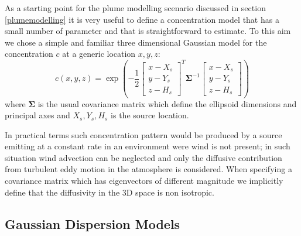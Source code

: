 \documentclass[a4paper,11pt]{report}
\begin{document}
As a starting point for the plume modelling scenario discussed in section \ref{plumemodelling} it is very useful to define a concentration model that has a small number of parameter and that is straightforward to estimate. 
To this aim we chose a simple and familiar three dimensional Gaussian model for the concentration $c$ at a generic location $x,y,z$:
\begin{equation}\label{eqn:singlesourcegaussian}
c(x,y,z) = %
\exp\left(-\frac{1}{2}
\left[\begin{array}{c}
x-X_s\\
y-Y_s\\
z-H_s
\end{array} \right]^T{\boldsymbol\Sigma}^{-1}
\left[\begin{array}{c}
x-X_s\\
y-Y_s\\
z-H_s
\end{array} \right]
\right)
\end{equation}
where $\boldsymbol\Sigma$ is the usual covariance matrix which define the ellipsoid dimensions and principal axes and $X_s,Y_s,H_s$ is the source location.

In practical terms such concentration pattern would be produced by a source emitting at a constant rate in an environment were wind is not present; in such situation wind advection can be neglected and only the diffusive contribution from turbulent eddy motion in the atmosphere is considered. When specifying a covariance matrix which has eigenvectors of different magnitude we implicitly define that the diffusivity in the 3D space is non isotropic.

\subsection{Gaussian Dispersion Models}
\end{document}
